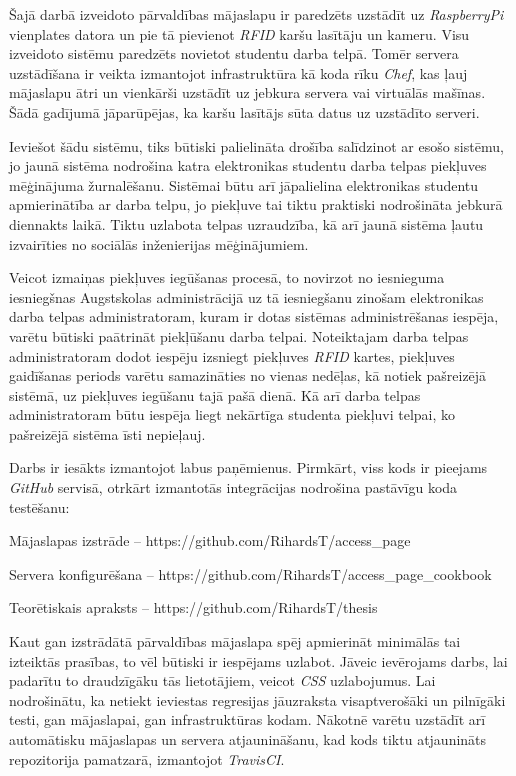 Šajā darbā izveidoto pārvaldības mājaslapu ir paredzēts uzstādīt uz
\textit{RaspberryPi} vienplates datora un pie tā pievienot \textit{RFID}
karšu lasītāju un kameru. Visu izveidoto sistēmu paredzēts novietot studentu darba telpā.
Tomēr servera uzstādīšana ir veikta izmantojot infrastruktūra kā koda rīku \textit{Chef}, kas ļauj mājaslapu ātri un vienkārši uzstādīt uz jebkura servera vai virtuālās mašīnas. Šādā gadījumā jāparūpējas, ka karšu lasītājs sūta datus uz uzstādīto serveri.

Ieviešot šādu sistēmu, tiks būtiski palielināta drošība salīdzinot ar esošo sistēmu, jo jaunā sistēma nodrošina katra elektronikas studentu darba telpas piekļuves mēģinājuma žurnalēšanu. Sistēmai būtu arī jāpalielina elektronikas studentu apmierinātība ar darba telpu, jo piekļuve tai tiktu praktiski nodrošināta jebkurā diennakts laikā. Tiktu uzlabota telpas uzraudzība, kā arī jaunā sistēma ļautu izvairīties no sociālās inženierijas mēģinājumiem.

Veicot izmaiņas piekļuves iegūšanas procesā, to novirzot no iesnieguma iesniegšnas Augstskolas administrācijā uz tā iesniegšanu zinošam elektronikas darba telpas administratoram, kuram ir dotas sistēmas administrēšanas iespēja, varētu būtiski paātrināt piekļūšanu darba telpai. Noteiktajam darba telpas administratoram dodot iespēju izsniegt piekļuves \textit{RFID} kartes, piekļuves gaidīšanas periods varētu samazināties no vienas nedēļas, kā notiek pašreizējā sistēmā, uz piekļuves iegūšanu tajā pašā dienā. Kā arī darba telpas administratoram būtu iespēja liegt nekārtīga studenta piekļuvi telpai, ko pašreizējā sistēma īsti nepieļauj.

Darbs ir iesākts izmantojot labus paņēmienus. Pirmkārt, viss kods ir pieejams \textit{GitHub} servisā, otrkārt izmantotās integrācijas nodrošina pastāvīgu koda testēšanu:
\begin{describe}
	\item Mājaslapas izstrāde -- https://github.com/RihardsT/access_page
	\item Servera konfigurēšana -- https://github.com/RihardsT/access_page_cookbook
	\item Teorētiskais apraksts -- https://github.com/RihardsT/thesis
\end{describe}

Kaut gan izstrādātā pārvaldības mājaslapa spēj apmierināt minimālās tai izteiktās prasības, to vēl būtiski ir iespējams uzlabot. Jāveic ievērojams darbs, lai padarītu to draudzīgāku tās lietotājiem, veicot \textit{CSS} uzlabojumus. Lai nodrošinātu, ka netiekt ieviestas regresijas jāuzraksta visaptverošāki un pilnīgāki testi, gan mājaslapai, gan infrastruktūras kodam. Nākotnē varētu uzstādīt arī automātisku mājaslapas un servera atjaunināšanu, kad kods tiktu atjaunināts repozitorija pamatzarā, izmantojot \textit{TravisCI}.

